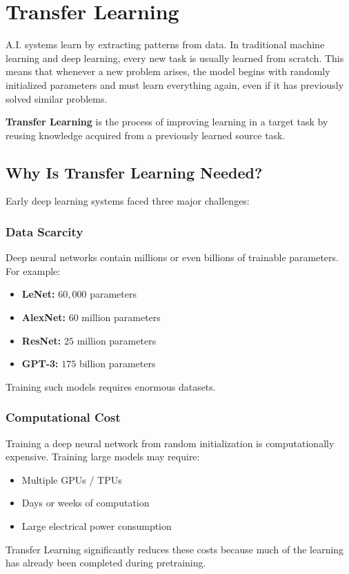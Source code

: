 
\chapter{Transfer Learning}

A.I. systems learn by extracting patterns from data. In traditional machine learning and deep learning, every new task is usually learned from scratch. This means that whenever a new problem arises, the model begins with randomly initialized parameters and must learn everything again, even if it has previously solved similar problems.

\begin{propertybox}
\textbf{Transfer Learning} is the process of improving learning in a target task by reusing knowledge acquired from a previously learned source task.
\end{propertybox}

\section{Why Is Transfer Learning Needed?}

Early deep learning systems faced three major challenges:

\subsection{Data Scarcity}
Deep neural networks contain millions or even billions of trainable parameters. For example:
\begin{itemize}
    \item \textbf{LeNet:} $60,000$ parameters
    \item \textbf{AlexNet:} $60$ million parameters
    \item \textbf{ResNet:} $25$ million parameters
    \item \textbf{GPT-3:} $175$ billion parameters
\end{itemize}
Training such models requires enormous datasets.

\subsection{Computational Cost}
Training a deep neural network from random initialization is computationally expensive. Training large models may require:
\begin{itemize}
    \item Multiple GPUs / TPUs
    \item Days or weeks of computation
    \item Large electrical power consumption
\end{itemize}
Transfer Learning significantly reduces these costs because much of the learning has already been completed during pretraining.

